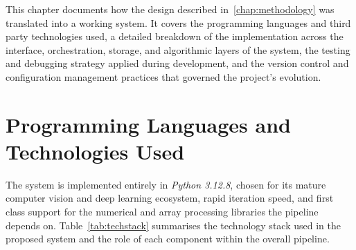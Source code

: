 
This chapter documents how the design described in~\cref{chap:methodology} was translated into a working system. It covers the programming languages and third party technologies used, a detailed breakdown of the implementation across the interface, orchestration, storage, and algorithmic layers of the system, the testing and debugging strategy applied during development, and the version control and configuration management practices that governed the project's evolution.

\section{Programming Languages and Technologies Used}

The system is implemented entirely in \textit{Python 3.12.8}, chosen for its mature computer vision and deep learning ecosystem, rapid iteration speed, and first class support for the numerical and array processing libraries the pipeline depends on. Table~\ref{tab:techstack} summarises the technology stack used in the proposed system and the role of each component within the overall pipeline.

